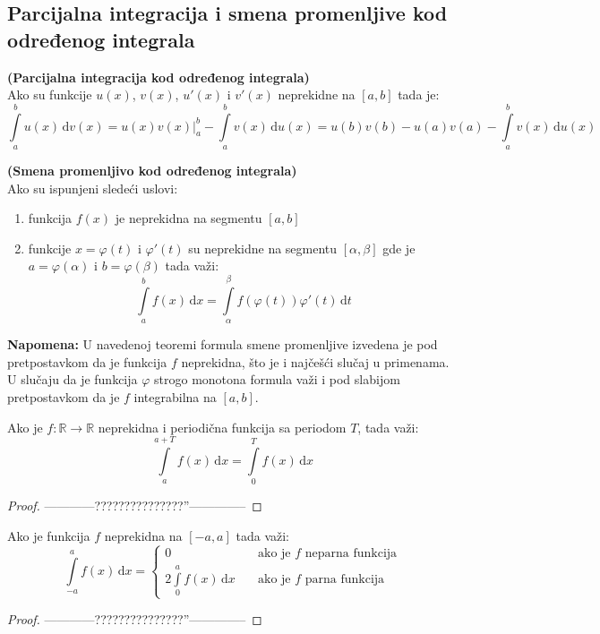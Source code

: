 \subsection{Parcijalna integracija i smena promenljive kod određenog integrala}
\begin{theorem}
	\textbf{(Parcijalna integracija kod određenog integrala)}\\
	Ako su funkcije $u(x)$, $v(x)$, $u'(x)$ i $v'(x)$ neprekidne na $[a,b]$ tada je:
	$$\int\limits^b_a u(x)\, \mathrm{d} v(x) = u(x)v(x)|^b_a - \int\limits^b_a v(x)\, \mathrm{d} u(x) = u(b)v(b) - u(a)v(a) - \int\limits^b_a v(x)\, \mathrm{d} u(x)$$
\end{theorem}
\begin{theorem}
	\textbf{(Smena promenljivo kod određenog integrala)}\\
	Ako su ispunjeni sledeći uslovi:
	\begin{enumerate}[label = \alph*)]
		\item 
			funkcija $f(x)$ je neprekidna na segmentu $[a,b]$
		\item 
			funkcije $x=\varphi(t)$ i $\varphi'(t)$ su neprekidne na segmentu $[\alpha, \beta]$ gde je $a = \varphi(\alpha)$ i $b = \varphi(\beta)$ tada važi:
			$$\int \limits^b_a f(x) \, \mathrm{d}x = \int \limits^\beta_\alpha f(\varphi(t))\varphi'(t)\, \mathrm{d}t$$
	\end{enumerate}
	\textbf{Napomena:} U navedenoj teoremi formula smene promenljive izvedena je pod pretpostavkom da je funkcija $f$ neprekidna, što je i najčešći slučaj u primenama. U slučaju da je funkcija $\varphi$ strogo monotona formula važi i pod slabijom pretpostavkom da je $f$ integrabilna na $[a,b]$.
\end{theorem}
\begin{theorem}
	Ako je $f:\mathbb{R}\to \mathbb{R}$ neprekidna i periodična funkcija sa periodom $T$, tada važi:
	$$\int \limits^{a+T}_a f(x) \, \mathrm{d}x = \int \limits^T_0 f(x) \, \mathrm{d}x$$
\end{theorem}
\begin{proof}
------------???????????????''--------------
\end{proof}
\begin{theorem}
	Ako je funkcija $f$ neprekidna na $[-a, a]$ tada važi:
	$$\int \limits^a_{-a}f(x)\, \mathrm{d} x =
	\begin{cases}
		0 &\text{ako je }f\text{ neparna funkcija}\\
		2\int\limits^a_0 f(x)\, \mathrm{d} x \quad &\text{ako je }f\text{ parna funkcija}
	\end{cases}
	$$
\end{theorem}
\begin{proof}
------------???????????????''--------------
\end{proof}

